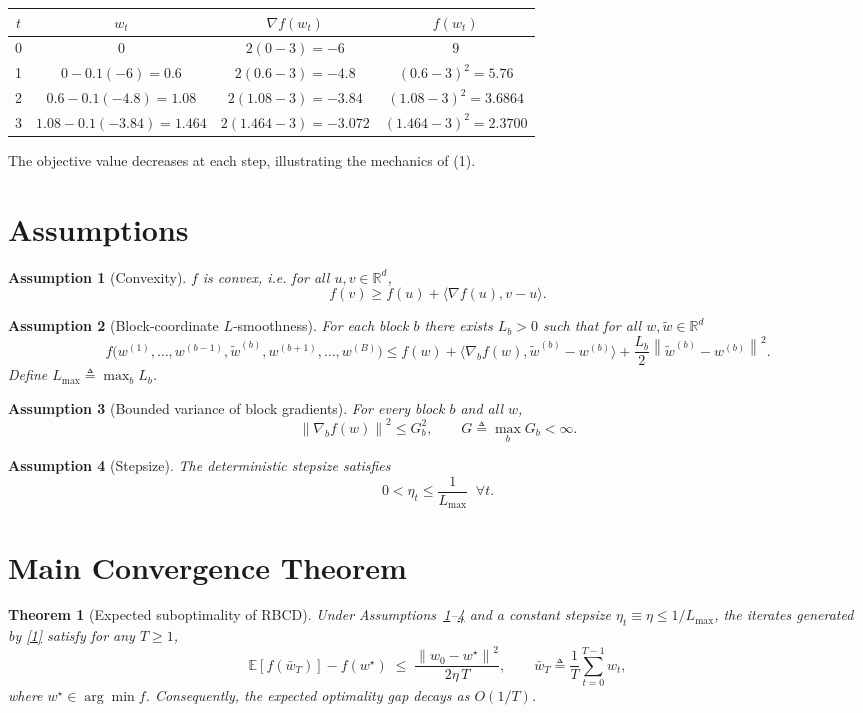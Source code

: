\documentclass{article}
\newtheorem{theorem}{Theorem}
\newtheorem{assumption}{Assumption}
\newcommand{\E}{\mathbb{E}}
\newcommand{\R}{\mathbb{R}}
\newcommand{\norm}[1]{\left\lVert #1\right\rVert}
\begin{document}
\begin{center}
\begin{tabular}{c|c|c|c}
$t$ & $w_{t}$ & $\nabla f(w_{t})$ & $f(w_{t})$ \\ \hline
0 & $0$ & $2(0-3)=-6$ & $9$ \\ 
1 & $0-0.1(-6)=0.6$ & $2(0.6-3)=-4.8$ & $(0.6-3)^{2}=5.76$ \\ 
2 & $0.6-0.1(-4.8)=1.08$ & $2(1.08-3)=-3.84$ & $(1.08-3)^{2}=3.6864$ \\ 
3 & $1.08-0.1(-3.84)=1.464$ & $2(1.464-3)=-3.072$ & $(1.464-3)^{2}=2.3700$ 
\end{tabular}
\end{center}
The objective value decreases at each step, illustrating the mechanics of (1).

\newpage

\section*{Assumptions}
\begin{assumption}[Convexity]\label{ass:convex}
$f$ is convex, i.e. for all $u,v\in\R^{d}$,
\[
f(v)\ge f(u)+\langle \nabla f(u),v-u\rangle .
\]
\end{assumption}

\begin{assumption}[Block‑coordinate $L$‑smoothness]\label{ass:smooth}
For each block $b$ there exists $L_{b}>0$ such that for all $w,\tilde w\in\R^{d}$
\[
f\bigl(w^{(1)},\dots ,w^{(b-1)},\tilde w^{(b)},w^{(b+1)},\dots ,w^{(B)}\bigr)
\le
f(w)+\langle \nabla_{b}f(w),\tilde w^{(b)}-w^{(b)}\rangle
+\frac{L_{b}}{2}\norm{\tilde w^{(b)}-w^{(b)}}^{2}.
\tag{2}
\]
Define $L_{\max}\triangleq \max_{b}L_{b}$.
\end{assumption}

\begin{assumption}[Bounded variance of block gradients]\label{ass:bounded}
For every block $b$ and all $w$,
\[
\norm{\nabla_{b}f(w)}^{2}\le G_{b}^{2},
\qquad G\triangleq \max_{b}G_{b}<\infty .
\]
\end{assumption}

\begin{assumption}[Stepsize]\label{ass:stepsize}
The deterministic stepsize satisfies 
\[
0<\eta_{t}\le \frac{1}{L_{\max}}\;\;\forall t .
\]
\end{assumption}

\section*{Main Convergence Theorem}
\begin{theorem}[Expected suboptimality of RBCD]\label{thm:main}
Under Assumptions~\ref{ass:convex}–\ref{ass:stepsize} and a constant stepsize
$\eta_{t}\equiv\eta\le 1/L_{\max}$,
the iterates generated by \eqref{1} satisfy for any $T\ge1$,
\[
\E\!\left[ f(\bar w_{T})\right]-f(w^{\star})
\;\le\;
\frac{\norm{w_{0}-w^{\star}}^{2}}{2\eta\,T},
\qquad 
\bar w_{T}\triangleq\frac{1}{T}\sum_{t=0}^{T-1}w_{t},
\tag{3}
\]
where $w^{\star}\in\arg\min f$.
Consequently, the expected optimality gap decays as $O(1/T)$.
\end{theorem}
\end{document}
